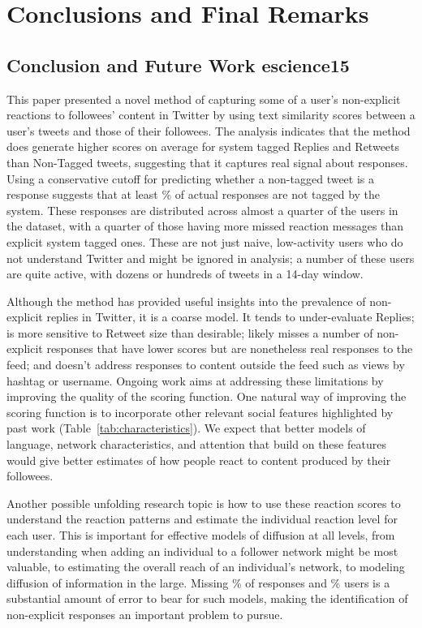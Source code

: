 \chapter{Conclusions and Final Remarks}

\section{Conclusion and Future Work escience15}

This paper presented a novel method of capturing some of a user's non-explicit reactions to followees' content in Twitter by using text similarity scores between a user's tweets and those of their followees.  The analysis indicates that the method does generate higher scores on average for system tagged Replies and Retweets than Non-Tagged tweets, suggesting that it captures real signal about responses.  Using a conservative cutoff for predicting whether a non-tagged tweet is a response suggests that at least \highNonTaggedTweetCountPct{}\% of actual responses are not tagged by the system.  These responses are distributed across almost a quarter of the users in the dataset, with a quarter of those having more missed reaction messages than explicit system tagged ones. These are not just naive, low-activity users who do not understand Twitter and might be ignored in analysis; a number of these users are quite active, with dozens or hundreds of tweets in a 14-day window.  

Although the method has provided useful insights into the prevalence of non-explicit replies in Twitter, it is a coarse model.  It tends to under-evaluate Replies; is more sensitive to Retweet size than desirable; likely misses a number of non-explicit responses that have lower scores but are nonetheless real responses to the feed; and doesn't address responses to content outside the feed such as views by hashtag or username.  Ongoing work aims at addressing these limitations by improving the quality of the scoring function.  One natural way of improving the scoring function is to incorporate other relevant social features highlighted by past work (Table~\ref{tab:characteristics}).  We expect that better models of language, network characteristics, and attention that build on these features would give better estimates of how people react to content produced by their followees.

Another possible unfolding research topic is how to use these reaction scores to understand the reaction patterns and estimate the individual reaction level for each user.  This is important for effective models of diffusion at all levels, from understanding when adding an individual to a follower network might be most valuable, to estimating the overall reach of an individual's network, to modeling diffusion of information in the large.  Missing \highNonTaggedTweetCountPct{}\% of responses and \usersAboveLinePct{}\% users is a substantial amount of error to bear for such models, making the identification of non-explicit responses an important problem to pursue.


